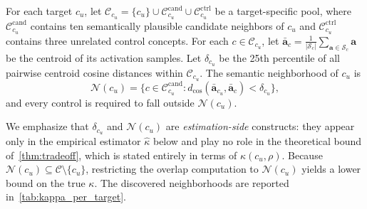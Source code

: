 \begin{definition}
\label{def:semantic_neighborhood}
For each target $c_u$, let $\mathcal{C}_{c_u}=\{c_u\}\cup\mathcal{C}^{\text{cand}}_{c_u}\cup\mathcal{C}^{\text{ctrl}}_{c_u}$
be a target-specific pool, where $\mathcal{C}^{\text{cand}}_{c_u}$ contains ten
semantically plausible candidate neighbors of $c_u$ and $\mathcal{C}^{\text{ctrl}}_{c_u}$
contains three unrelated control concepts. For each
$c\in\mathcal{C}_{c_u}$, let $\bar{\mathbf{a}}_c=\frac{1}{|\mathcal{S}_c|}\sum_{\mathbf{a}\in\mathcal{S}_c}\mathbf{a}$ be the
centroid of its activation samples. Let $\delta_{c_u}$ be the 25th percentile of
all pairwise centroid cosine distances within $\mathcal{C}_{c_u}$. The semantic
neighborhood of $c_u$ is
\begin{equation}
\mathcal{N}(c_u)=\bigl\{c\in\mathcal{C}^{\text{cand}}_{c_u}:
d_{\cos}(\bar{\mathbf{a}}_{c_u},\bar{\mathbf{a}}_c)<\delta_{c_u}\bigr\},
\end{equation}
and every control is required to fall outside $\mathcal{N}(c_u)$.
\end{definition}
We emphasize that $\delta_{c_u}$ and $\mathcal{N}(c_u)$ are \emph{estimation-side} constructs: they appear only in the empirical estimator $\hat\kappa$ below and play no role in the theoretical bound of~\cref{thm:tradeoff}, which is stated entirely in terms of $\kappa(c_u, \rho)$. Because $\mathcal{N}(c_u) \subseteq \mathcal{C} \setminus \{c_u\}$, restricting the overlap computation to $\mathcal{N}(c_u)$ yields a lower bound on the true $\kappa$. The discovered neighborhoods are reported in~\cref{tab:kappa_per_target}.



